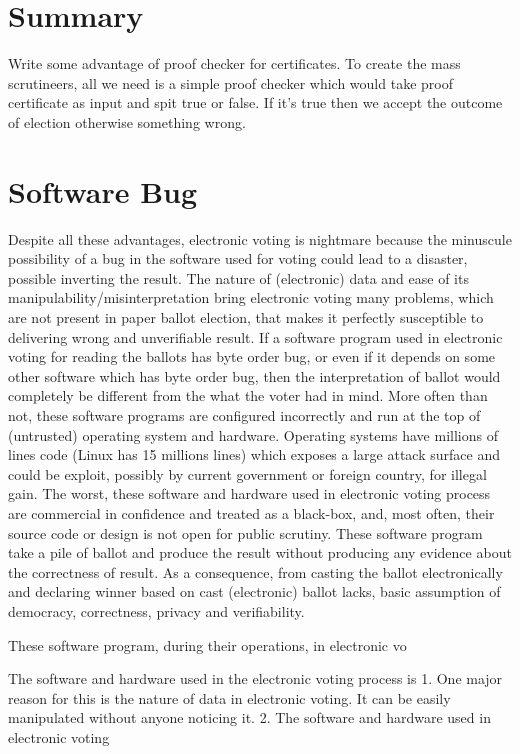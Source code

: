 \section{Summary}
   Write some advantage of proof checker for certificates.
   To create the mass scrutineers, all we need is a simple proof checker
   which would take proof certificate as input and spit true or false.
   If it's true then we accept the outcome of election otherwise something 
   wrong.
   
   \section{Software Bug}
Despite all these advantages, electronic voting is nightmare because the minuscule possibility of a bug in 
the software used for voting could lead to a disaster, possible inverting the result.  The nature of (electronic) data and ease of 
its manipulability/misinterpretation bring electronic voting many problems, which are not present in paper ballot election, that 
makes it perfectly susceptible to delivering wrong and unverifiable result. If a software program used in electronic voting 
for reading the ballots has byte order bug, or even if it depends on some other software which has byte order bug, then the interpretation of 
ballot would completely be different from the what the voter had in mind. More often than not, these software programs are 
configured incorrectly and run at the top of (untrusted) operating system and hardware. Operating systems have millions of 
lines code (Linux has 15 millions lines) which exposes a large attack surface and could be exploit, possibly by current government 
or foreign country, for illegal gain. The worst, these software and hardware used in electronic voting process are commercial in 
confidence and treated as a black-box, and, most often, their source code or design is not open for public scrutiny. These software program 
take a pile of ballot and produce the result without producing any evidence about the correctness of result.  As a consequence,
from casting the ballot electronically and declaring winner based on cast (electronic) ballot lacks, basic assumption 
of democracy, correctness, privacy and verifiability. 


These software program, during their operations, in electronic vo



The software and hardware 
used in the electronic voting process is 
1.  One major reason for this  is the nature of data in electronic voting. It can be easily manipulated without anyone noticing it. 
2. The software and  hardware used in electronic voting 




